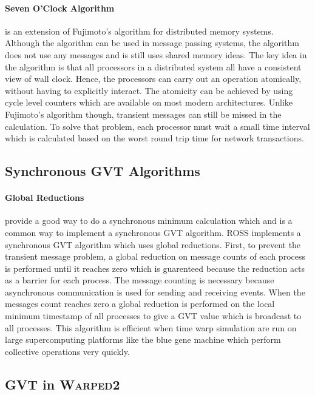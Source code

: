 \documentclass[11pt]{book}
\begin{document}
\paragraph{Seven O'Clock Algorithm}\cite{bauer-05} is an extension of Fujimoto's algorithm
for distributed memory systems. Although the algorithm can be used in message passing systems,
the algorithm does not use any messages and is still uses shared memory ideas. The key idea
in the algorithm is that all processors in a distributed system all have a consistent view
of wall clock. Hence, the processors can carry out an operation atomically, without having
to explicitly interact. The atomicity can be achieved by using cycle level counters which
are available on most modern architectures. Unlike Fujimoto's algorithm though, transient
messages can still be missed in the calculation. To solve that problem, each processor must
wait a small time interval which is calculated based on the worst round trip time for
network transactions.

\subsection{Synchronous GVT Algorithms}

\paragraph{Global Reductions} provide a good way to do a synchronous minimum calculation
which and is a common way to implement a synchronous GVT algorithm. ROSS implements a
synchronous GVT algorithm which uses global reductions\cite{holder-08}. First, to prevent
the transient message problem, a global reduction on message counts of each process is
performed until it reaches zero which is guarenteed because the reduction acts as a barrier
for each process. The message counting is necessary because asynchronous communication is
used for sending and receiving events. When the messages count reaches zero a global
reduction is performed on the local minimum timestamp of all processes to give a GVT value
which is broadcast to all processes. This algorithm is efficient when time warp simulation
are run on large supercomputing platforms like the blue gene machine which perform collective
operations very quickly.

\subsection{GVT in \textsc{Warped2}}
\end{document}
